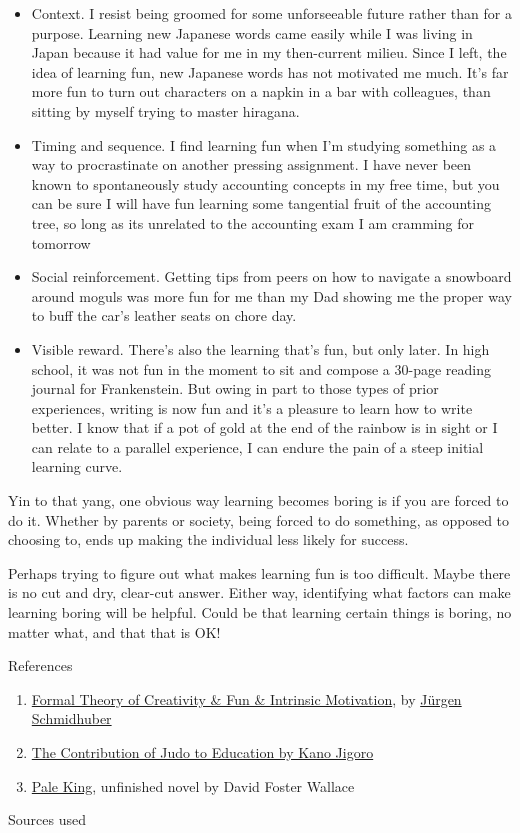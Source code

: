 \begin{itemize}
\item
  Context. I resist being groomed for some unforseeable future rather
  than for a purpose. Learning new Japanese words came easily while I
  was living in Japan because it had value for me in my then-current
  milieu. Since I left, the idea of learning fun, new Japanese words has
  not motivated me much. It's far more fun to turn out characters on a
  napkin in a bar with colleagues, than sitting by myself trying to
  master hiragana.
\item
  Timing and sequence. I find learning fun when I'm studying something
  as a way to procrastinate on another pressing assignment. I have never
  been known to spontaneously study accounting concepts in my free time,
  but you can be sure I will have fun learning some tangential fruit of
  the accounting tree, so long as its unrelated to the accounting exam I
  am cramming for tomorrow
\item
  Social reinforcement. Getting tips from peers on how to navigate a
  snowboard around moguls was more fun for me than my Dad showing me the
  proper way to buff the car's leather seats on chore day.
\item
  Visible reward. There's also the learning that's fun, but only later.
  In high school, it was not fun in the moment to sit and compose a
  30-page reading journal for Frankenstein. But owing in part to those
  types of prior experiences, writing is now fun and it's a pleasure to
  learn how to write better. I know that if a pot of gold at the end of
  the rainbow is in sight or I can relate to a parallel experience, I
  can endure the pain of a steep initial learning curve.
\end{itemize}
Yin to that yang, one obvious way learning becomes boring is if you are
forced to do it. Whether by parents or society, being forced to do
something, as opposed to choosing to, ends up making the individual less
likely for success.

Perhaps trying to figure out what makes learning fun is too difficult.
Maybe there is no cut and dry, clear-cut answer. Either way, identifying
what factors can make learning boring will be helpful. Could be that
learning certain things is boring, no matter what, and that that is OK!

References

\begin{enumerate}
\item
  \href{http://www.idsia.ch/\%7Ejuergen/creativity.html}{Formal Theory
  of Creativity \& Fun \& Intrinsic Motivation}, by
  \href{http://www.idsia.ch/\%7Ejuergen}{Jürgen Schmidhuber}
\item
  \href{http://en.wikipedia.org/w/index.php?title=Judo\&oldid=493563588}{The
  Contribution of Judo to Education by Kano Jigoro}
\item
  \href{http://en.wikipedia.org/wiki/The\_Pale\_King}{Pale King},
  unfinished novel by David Foster Wallace
\end{enumerate}
Sources used

